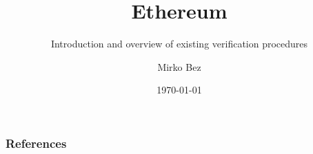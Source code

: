 \documentclass[usenames,dvipsnames]{beamer}
\title{Ethereum}
\subtitle{Introduction and overview of existing verification procedures}
\author{Mirko Bez}
\institute{Università di Padova}
\date{\today}
\begin{document}
\begin{frame}
  \titlepage
\end{frame}












\begin{frame}[allowframebreaks]
        \frametitle{References}
        
        
\end{frame}
\end{document}
